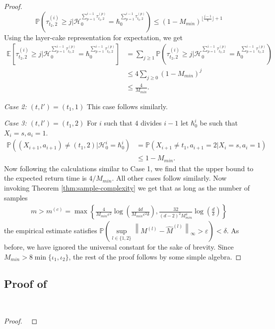 \documentclass[opre,sglanonrev]{informs4}
\numberwithin{equation}{section}
\newcommand{\pow}[1]{^{(#1)}}
\newcommand{\lp}{\left(}
\newcommand{\rp}{\right)}
\newcommand{\lc}{\left\{}
\newcommand{\rc}{\right\}}
\newcommand{\lb}{\left[}
\newcommand{\rb}{\right]}
\newcommand{\lV}{\left\|}
\newcommand{\rV}{\right\|}
\newcommand{\History}{\mathcal{H}}
\newcommand{\history}{\hbar}
\newcommand{\Pbb}{\mathbb{P}}
\newcommand{\prob}{\Pbb}
\newcommand{\expec}{\mathbb{E}}
\newcommand{\eps}{\varepsilon}
\renewcommand{\epsilon}{\eps}
\begin{document}
\begin{APPENDICES}
\begin{proof}
\[ \prob\lp\tau_{t_2,2}\pow i\geq j|\History_0^{\sum_{p=1}^{i-1}\tau_{t_2,2}\pow p}=\history_0^{\sum_{p=1}^{i-1}\tau_{t_2,2}\pow p}\rp\leq (1-M_{min})^{\lfloor\frac{j-1}{4}\rfloor+1}
\]
Using the layer-cake representation for expectation, we get 
\begin{align*}
    \expec\lb\tau_{t_2,2}\pow i\geq j|\History_0^{\sum_{p=1}^{i-1}\tau_{t_2,2}\pow p}=\history_0^{\sum_{p=1}^{i-1}\tau_{t_2,2}\pow p}\rb & = \sum_{j\geq 1}\prob\lp\tau_{t_2,2}\pow i\geq j|\History_0^{\sum_{p=1}^{i-1}\tau_{t_2,2}\pow p}=\history_0^{\sum_{p=1}^{i-1}\tau_{t_2,2}\pow p}\rp\\
    & \leq 4 \sum_{j\geq 0} (1-M_{min})^{j}\\
    & \leq \frac{4}{M_{min}}.
\end{align*}

\emph{Case 2: $(t,l')=(t_1,1)$} This case follows similarly.

\emph{Case 3: $(t,l')=(t_1,2)$} For $i$ such that $4$ divides $i-1$ let $\history_0^i$ be such that $X_i=s,a_i=1$.
\begin{align*}
    \prob\lp (X_{i+1},a_{i+1})\neq (t_1, 2)|\History_0^i = \history_0^i\rp & =  \prob\lp X_{i+1}\neq t_1,a_{i+1} = 2|X_i=s,a_i=1\rp\\
    & \leq 1-M_{min}.
\end{align*}
Now following the calculations similar to Case 1, we find that the upper bound to the expected return time is $4/M_{min}$. All other cases follow similarly. Now invoking Theorem \ref{thm:sample-complexity} we get that as long as the number of samples 
\begin{align*}
    m > m\pow c =\max\lc \frac{4}{M_{min}\eps^2}\log\lp\frac{4d}{M_{min}\epsilon^2\delta}\rp, \frac{32}{(d-2)^2 M_{min}^4} \log\lp \frac{d}{\delta}\rp\rc
\end{align*}
the empirical estimate satisfies $\prob\lp \underset{l\in\{1,2\}}{\sup} \lV M\pow l-\hat M\pow l \rV_{\infty} >\eps \rp<\delta$. As before, we have ignored the universal constant for the sake of brevity. Since $M_{min}>8\min\{\iota_1,\iota_2\}$, the rest of the proof follows by some simple algebra.
\end{proof}
\subsection{Proof of }~\label{prf:ep-mdp}
\begin{proof} \ 


\end{proof}
\end{APPENDICES}
\end{document}
